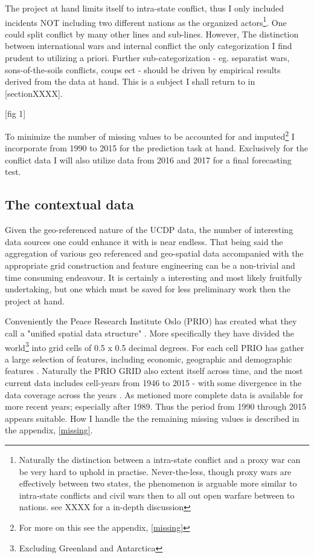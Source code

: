 \documentclass[a4paper]{article}
\begin{document}
The project at hand limits itself to intra-state conflict, thus I only included incidents NOT including two different nations as the organized actors\footnote{ Naturally the distinction between a intra-state conflict and a proxy war can be very hard to uphold in practise. Never-the-less, though proxy wars are effectively between two states, the phenomenon is arguable more similar to intra-state conflicts and civil wars then to all out open warfare between to nations. see XXXX for a in-depth discussion}. One could split conflict by many other lines and sub-lines. However, The distinction between international wars and internal conflict the only categorization I find prudent to utilizing a priori. Further sub-categorization - eg. separatist wars, sons-of-the-soils conflicts, coups ect - should be driven by empirical results derived from the data at hand. This is a subject I shall return to in [sectionXXXX].\par

[fig 1]

To minimize the number of missing values to be accounted for and imputed\footnote{For more on this see the appendix, \autoref{missing}} I incorporate from 1990 to 2015 for the prediction task at hand. Exclusively for the conflict data I will also utilize data from 2016 and 2017 for a final forecasting test.


\subsection{The contextual data}

Given the geo-referenced nature of the UCDP data, the number of interesting data sources one could enhance it with is near endless. That being said the aggregation of various geo referenced and geo-spatial data accompanied with the appropriate grid construction and feature engineering can be a non-trivial and time consuming endeavour. It is certainly a interesting and most likely fruitfully undertaking, but one which must be saved for less preliminary work then the project at hand.\par

Conveniently the Peace Research Institute Oslo (PRIO) has created what they call a "unified spatial data structure" \cite[1]{Tollefsen_2012}. More specifically they have divided the world\footnote{Excluding Greenland and Antarctica} into grid cells of 0.5 x 0.5 decimal degrees. For each cell PRIO has gather a large selection of features, including economic, geographic and demographic features \citep{Tollefsen_2012}. Naturally the PRIO GRID also extent itself across time, and the most current data includes cell-years from 1946 to 2015 - with some divergence in the data coverage across the years \citep{Tollefsen_2016}. As metioned more complete data is available for more recent years; especially after 1989. Thus the period from 1990 through 2015 appears suitable. How I handle the the remaining missing values is described in the appendix, \autoref{missing}.\par
\end{document}
